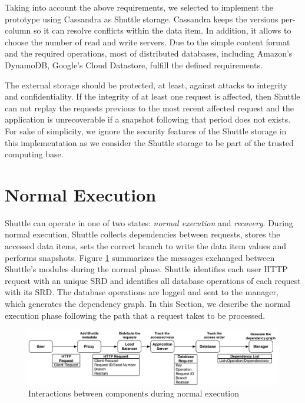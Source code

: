 Taking into account the above requirements, we selected to implement the prototype using Cassandra \cite{Lakshman2010a} as Shuttle storage. Cassandra keeps the versions per-column so it can resolve conflicts within the data item. In addition, it allows to choose the number of read and write servers. Due to the simple content format and the required operations, most of distributed databases, including Amazon's DynamoDB, Google's Cloud Datastore, fulfill the defined requirements.

The external storage should be protected, at least, against attacks to integrity and confidentiality. If the integrity of at least one request is affected, then Shuttle can not replay the requests previous to the most recent affected request and the application is unrecoverable if a snapshot following that period does not exists. For sake of simplicity, we ignore the security features of the Shuttle storage in this implementation as we consider the Shuttle storage to be part of the trusted computing base.








\section{Normal Execution}\label{sec:impl:normal}

Shuttle can operate in one of two states: \textit{normal execution} and \textit{recovery}. During normal execution, Shuttle collects  dependencies between requests, stores the accessed data items, sets the correct branch to write the data item values and performs snapshots. Figure \ref{fig:normal:mensaging} summarizes the messages exchanged between Shuttle's modules during the normal phase. Shuttle identifies each user \ac{HTTP} request with an unique \acf{SRD} and identifies all database operations of each request with its \ac{SRD}. The database operations are logged and sent to the manager, which generates the dependency graph. 
In this Section, we describe the normal execution phase following the path that a request takes to be processed.

\begin{figure}
  \centering
  \includegraphics[width=\textwidth]{images/message_normal}
  \caption{Interactions between components during normal execution}
  \label{fig:normal:mensaging}
\end{figure}




